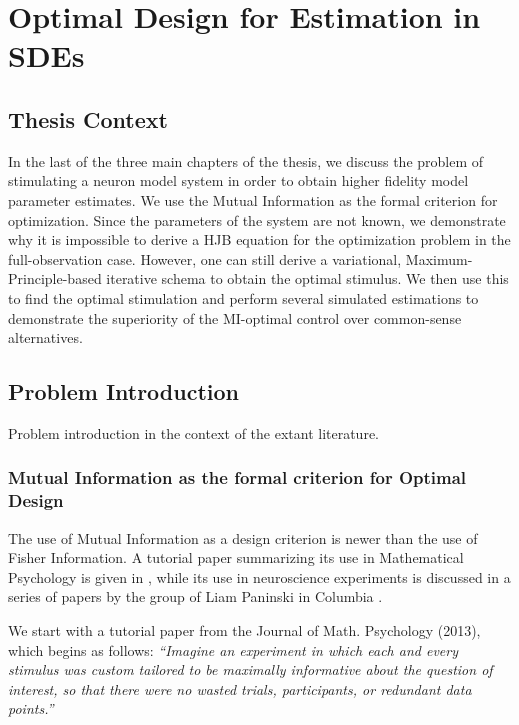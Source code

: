 \chapter{Optimal Design for Estimation in SDEs}
\label{ch:optimal_design}
\graphicspath{{../OptEstimate/}}


 
\section{Thesis Context}
 In the last of the three main chapters of the thesis, we discuss the problem of
 stimulating a neuron model system in order to obtain higher fidelity model
 parameter estimates. We use the Mutual Information as the formal criterion for optimization. Since the
 parameters of the system are not known, we demonstrate why it is impossible to derive a HJB equation for the
 optimization problem in the full-observation case. However, one can still
 derive a variational, Maximum-Principle-based iterative schema to obtain the
 optimal stimulus. We then use this to find the optimal stimulation and perform
 several simulated estimations to demonstrate the superiority of the
 MI-optimal control over common-sense alternatives. 
 
\section{Problem Introduction} 
Problem introduction in the context of the extant literature.

\subsection{Mutual Information as the formal criterion for Optimal Design}
The use of Mutual Information as a design criterion is newer than the use of
Fisher Information. A tutorial paper summarizing its use in Mathematical
Psychology is given in \cite{Myung2013}, while its use in neuroscience
experiments is discussed in a series of papers by the group of Liam Paninski in
Columbia \cite{Paninski2003,Paninski2005,Lewi2009}. 




We start with a tutorial paper from the Journal of Math. Psychology (2013),
which begins as follows: { \sl ``Imagine an experiment in which each and every
stimulus was custom tailored to be maximally informative about the question of
interest, so that there were no wasted trials, participants, or redundant data
points.''} 

